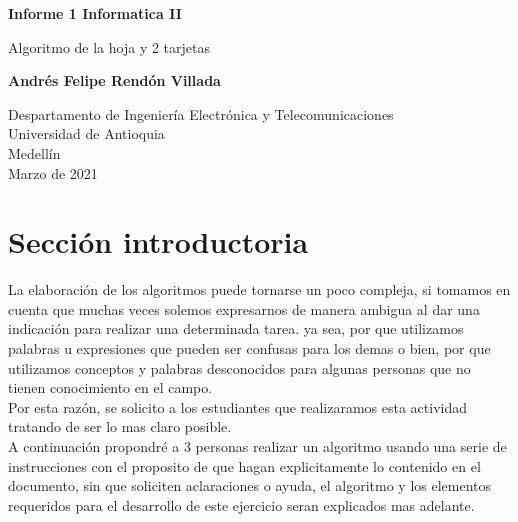\documentclass{article}
\begin{document}
\begin{titlepage}
    \begin{center}
        \vspace*{1cm}
            
        \Huge
        \textbf{Informe 1 Informatica II}
            
        \vspace{0.5cm}
        \LARGE
        Algoritmo de la hoja y 2 tarjetas
            
        \vspace{1.5cm}
            
        \textbf{Andrés Felipe Rendón Villada}
            
        \vfill
            
        \vspace{0.8cm}
            
        \Large
        Despartamento de Ingeniería Electrónica y Telecomunicaciones\\
        Universidad de Antioquia\\
        Medellín\\
        Marzo de 2021
            
    \end{center}
\end{titlepage}

\tableofcontents
\newpage
\section{Sección introductoria}\label{intro}
La elaboración de los algoritmos puede tornarse un poco compleja, si tomamos en cuenta que muchas veces solemos expresarnos de manera ambigua al dar una indicación para realizar una determinada tarea. ya sea, por que utilizamos palabras u expresiones que pueden ser confusas para los demas o bien, por que utilizamos conceptos y palabras desconocidos para algunas personas que no tienen conocimiento en el campo.
\\ Por esta razón, se solicito a los estudiantes que realizaramos esta actividad tratando de ser lo mas claro posible.
\\ A continuación propondré a 3 personas realizar un algoritmo usando una serie de instrucciones con el proposito de que hagan explicitamente lo contenido en el documento, sin que soliciten aclaraciones o ayuda, el algoritmo y los elementos requeridos para el desarrollo de este ejercicio seran explicados mas adelante.
\end{document}
